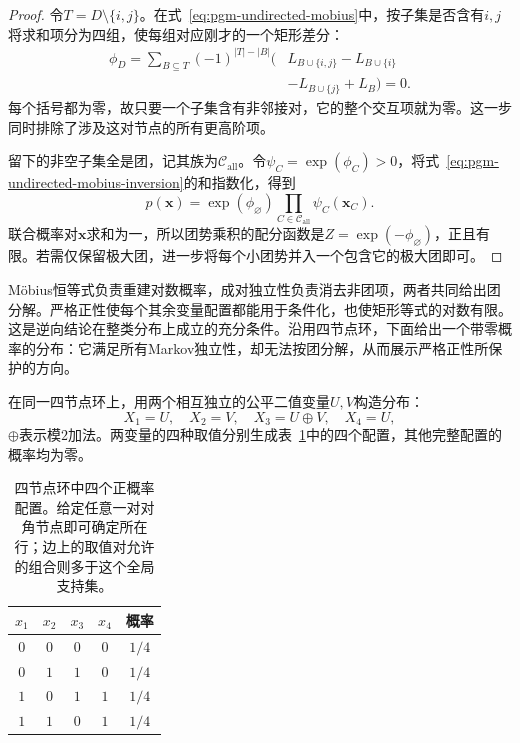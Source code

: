 \begin{proof}
令$T=D\setminus\{i,j\}$。在式~\eqref{eq:pgm-undirected-mobius}中，按子集是否含有$i,j$将求和项分为四组，使每组对应刚才的一个矩形差分：
\begin{equation}
  \begin{aligned}
    \phi_D
    =\sum_{B\subseteq T}(-1)^{|T|-|B|}
      \bigl(&L_{B\cup\{i,j\}}-L_{B\cup\{i\}}\\
            &-L_{B\cup\{j\}}+L_B\bigr)=0.
  \end{aligned}
  \label{eq:pgm-undirected-nonclique-vanishes}
\end{equation}
每个括号都为零，故只要一个子集含有非邻接对，它的整个交互项就为零。这一步同时排除了涉及这对节点的所有更高阶项。

留下的非空子集全是团，记其族为$\mathcal{C}_{\mathrm{all}}$。令$\psi_C=\exp(\phi_C)>0$，将式~\eqref{eq:pgm-undirected-mobius-inversion}的和指数化，得到
\[
  p(\bm{x})
  =\exp(\phi_{\varnothing})
     \prod_{C\in\mathcal{C}_{\mathrm{all}}}\psi_C(\bm{x}_C).
\]
联合概率对$\bm{x}$求和为一，所以团势乘积的配分函数是$Z=\exp(-\phi_{\varnothing})$，正且有限。若需仅保留极大团，进一步将每个小团势并入一个包含它的极大团即可。
\end{proof}

Möbius恒等式负责重建对数概率，成对独立性负责消去非团项，两者共同给出团分解。严格正性使每个其余变量配置都能用于条件化，也使矩形等式的对数有限。这是逆向结论在整类分布上成立的充分条件。沿用四节点环，下面给出一个带零概率的分布：它满足所有Markov独立性，却无法按团分解，从而展示严格正性所保护的方向。

\begin{example}[满足全局Markov性质却不能团分解]
  \label{ex:pgm-undirected-zero-support}
  在同一四节点环上，用两个相互独立的公平二值变量$U,V$构造分布：
  \[
    X_1=U,\quad X_2=V,\quad
    X_3=U\mathbin{\oplus}V,\quad X_4=U,
  \]
  $\oplus$表示模$2$加法。两变量的四种取值分别生成表~\ref{tab:pgm-undirected-zero-support}中的四个配置，其他完整配置的概率均为零。
\end{example}

\begin{table}[htbp]
  \centering
  \begin{tabular}{ccccc}
    \toprule
    $x_1$ & $x_2$ & $x_3$ & $x_4$ & 概率 \\
    \midrule
    $0$ & $0$ & $0$ & $0$ & $1/4$ \\
    $0$ & $1$ & $1$ & $0$ & $1/4$ \\
    $1$ & $0$ & $1$ & $1$ & $1/4$ \\
    $1$ & $1$ & $0$ & $1$ & $1/4$ \\
    \bottomrule
  \end{tabular}
  \caption{四节点环中四个正概率配置。给定任意一对对角节点即可确定所在行；边上的取值对允许的组合则多于这个全局支持集。}
  \label{tab:pgm-undirected-zero-support}
\end{table}

